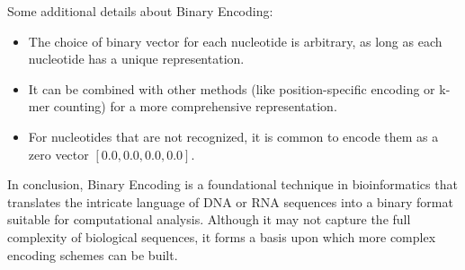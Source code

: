 \noindent
Some additional details about Binary Encoding:

\begin{itemize}
  \item The choice of binary vector for each nucleotide is arbitrary, as long as
   each nucleotide has a unique representation.
  
  \item It can be combined with other methods (like position-specific encoding or
   k-mer counting) for a more comprehensive representation.
  
  \item For nucleotides that are not recognized, it is common to encode them as 
  a zero vector $[0.0, 0.0, 0.0, 0.0]$.
\end{itemize}

\noindent
In conclusion, Binary Encoding is a foundational technique in bioinformatics that 
translates the intricate language of DNA or RNA sequences into a binary format 
suitable for computational analysis. Although it may not capture the full complexity 
of biological sequences, it forms a basis upon which more complex encoding schemes 
can be built.